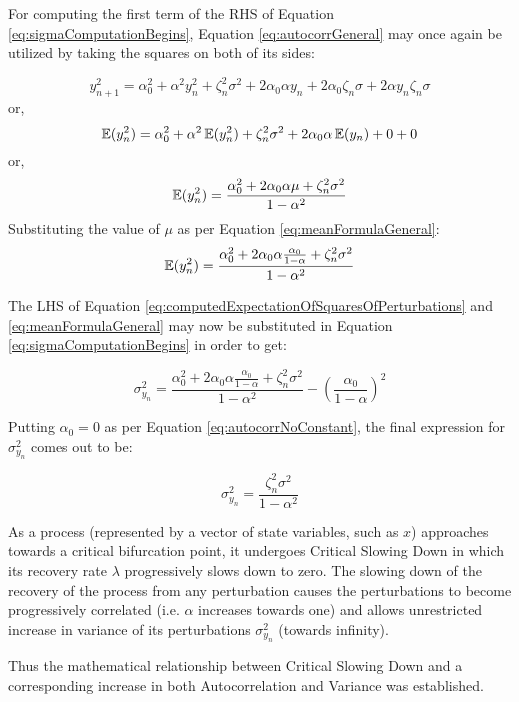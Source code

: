 For computing the first term of the RHS of Equation \ref{eq:sigmaComputationBegins}, Equation \ref{eq:autocorrGeneral} may once again be utilized by taking the squares on both of its sides:

\begin{equation}
	y^2_{n+1} = \alpha^2_0 + \alpha^2 y^2_{n} + \zeta^2_n \sigma^2 + 2\alpha_0 \alpha y_{n} + 2\alpha_0 \zeta_n \sigma + 2\alpha y_{n} \zeta_n \sigma
\end{equation}
\hspace{25pt} or,
\begin{equation}
	\EX(y^2_{n}) = \alpha^2_0 + \alpha^2 \EX(y^2_{n}) + \zeta^2_{n} \sigma^2 + 2\alpha_0\alpha\EX(y_{n}) + 0 + 0
\end{equation}
\hspace{25pt} or,
\begin{equation}
	\EX(y^2_{n}) = \frac{\alpha^2_{0} + 2\alpha_0\alpha\mu + \zeta^2_{n}\sigma^2}{1-\alpha^2}
\end{equation}
Substituting the value of $\mu$ as per Equation \ref{eq:meanFormulaGeneral}:
\begin{equation}
	\label{eq:computedExpectationOfSquaresOfPerturbations}
	\EX(y^2_{n}) = \frac{\alpha^2_{0} + 2\alpha_0\alpha\frac{\alpha_0}{1-\alpha} + \zeta^2_{n}\sigma^2}{1-\alpha^2}
\end{equation}

 The LHS of Equation \ref{eq:computedExpectationOfSquaresOfPerturbations} and \ref{eq:meanFormulaGeneral} may now be substituted in Equation \ref{eq:sigmaComputationBegins} in order to get:
 
 \begin{equation}
 	\sigma^2_{y_{n}} = \frac{\alpha^2_{0} + 2\alpha_0\alpha\frac{\alpha_0}{1-\alpha} + \zeta^2_{n}\sigma^2}{1-\alpha^2} - \left(\frac{\alpha_0}{1-\alpha}\right)^2
 \end{equation}

Putting $\alpha_0 = 0$ as per Equation \ref{eq:autocorrNoConstant}, the final expression for $\sigma^2_{y_n}$ comes out to be:

\begin{equation}
	\label{eq:varianceFormulaNoConstant}
	\sigma^2_{y_n} = \frac{\zeta^2_{n}\sigma^2}{1-\alpha^2}
\end{equation}

As a process (represented by a vector of state variables, such as $x$) approaches towards a critical bifurcation point, it undergoes Critical Slowing Down in which its recovery rate $\lambda$ progressively slows down to zero.  The slowing down of the recovery of the process from any perturbation causes the perturbations to become progressively correlated (i.e. $\alpha$ increases towards one) and allows unrestricted increase in variance of its perturbations $\sigma^2_{y_{n}}$ (towards infinity).

Thus the mathematical relationship between Critical Slowing Down and a corresponding increase in both Autocorrelation and Variance was established. 